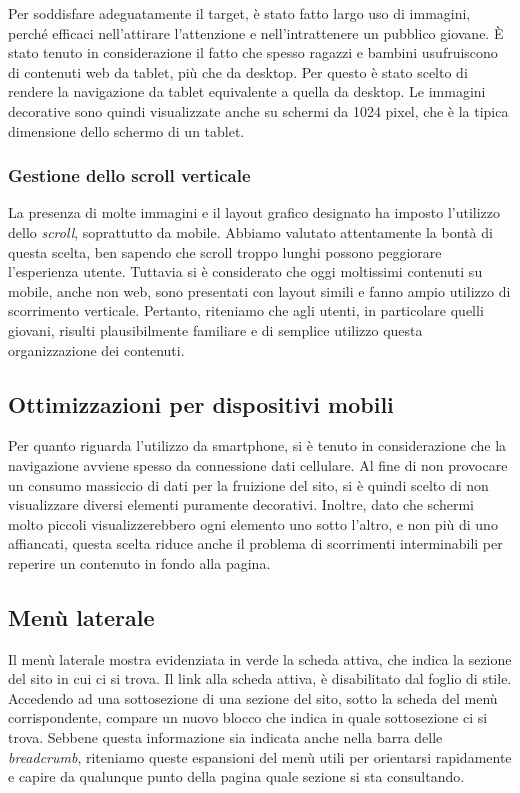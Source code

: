 \documentclass[12pt]{article}
\begin{document}
		Per soddisfare adeguatamente il target, è stato fatto largo uso di immagini, perché efficaci nell'attirare l'attenzione e nell'intrattenere un pubblico giovane. È stato tenuto in considerazione il fatto che spesso ragazzi e bambini usufruiscono di contenuti web da tablet, più che da desktop. Per questo è stato scelto di rendere la navigazione da tablet equivalente a quella da desktop. Le immagini decorative sono quindi visualizzate anche su schermi da 1024 pixel, che è la tipica dimensione dello schermo di un tablet.
	
		\subsubsection{Gestione dello scroll verticale}
		La presenza di molte immagini e il layout grafico designato ha imposto l'utilizzo dello \textit{scroll}, soprattutto da mobile. Abbiamo valutato attentamente la bontà di questa scelta, ben sapendo che scroll troppo lunghi possono peggiorare l'esperienza utente. Tuttavia si è considerato che oggi moltissimi contenuti su mobile, anche non web, sono presentati con layout simili e fanno ampio utilizzo di scorrimento verticale. Pertanto, riteniamo che agli utenti, in particolare quelli giovani, risulti plausibilmente familiare e di semplice utilizzo questa organizzazione dei contenuti.
		
		\subsection{Ottimizzazioni per dispositivi mobili}
		Per quanto riguarda l'utilizzo da smartphone, si è tenuto in considerazione che la navigazione avviene spesso da connessione dati cellulare. Al fine di non provocare un consumo massiccio di dati per la fruizione del sito, si è quindi scelto di non visualizzare diversi elementi puramente decorativi. Inoltre, dato che schermi molto piccoli visualizzerebbero ogni elemento uno sotto l'altro, e non più di uno affiancati, questa scelta riduce anche il problema di scorrimenti interminabili per reperire un contenuto in fondo alla pagina.
	
	\subsection{Menù laterale} \label{ssec:menuusab}
	Il menù laterale mostra evidenziata in verde la scheda attiva, che indica la sezione del sito in cui ci si trova. Il link alla scheda attiva, è disabilitato dal foglio di stile. Accedendo ad una sottosezione di una sezione del sito, sotto la scheda del menù corrispondente, compare un nuovo blocco che indica in quale sottosezione ci si trova. Sebbene questa informazione sia indicata anche nella barra delle \textit{breadcrumb}, riteniamo queste espansioni del menù utili per orientarsi rapidamente e capire da qualunque punto della pagina quale sezione si sta consultando.
	
\end{document}
